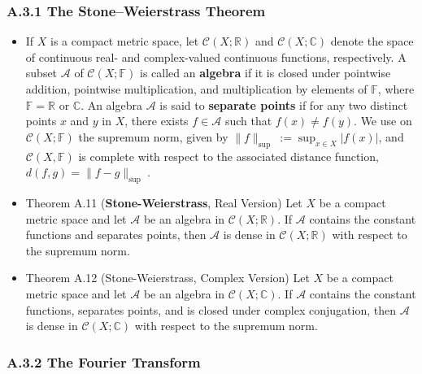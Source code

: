 \subsubsection{A.3.1 The Stone–Weierstrass Theorem}
\begin{itemize}
\item If $X$ is a compact metric space, let $\mathcal{C}(X ; \mathbb{R})$ and $\mathcal{C}(X ; \mathbb{C})$ denote the space of continuous real- and complex-valued continuous functions, respectively. A subset $\mathcal{A}$ of $\mathcal{C}(X ; \mathbb{F})$ is called an \textbf{algebra} if it is closed under pointwise addition, pointwise multiplication, and multiplication by elements of $\mathbb{F}$, where $\mathbb{F}=\mathbb{R}$ or $\mathbb{C}$. An algebra $\mathcal{A}$ is said to \textbf{separate points} if for any two distinct points $x$ and $y$ in $X$, there exists $f \in \mathcal{A}$ such that $f(x) \neq f(y)$. We use on $\mathcal{C}(X ; \mathbb{F})$ the supremum norm, given by $\|f\|_{\text {sup }}:=\sup _{x \in X}|f(x)|$, and $\mathcal{C}(X, \mathbb{F})$ is complete with respect to the associated distance function, $d(f, g)=\|f-g\|_{\text {sup }}$.

\item Theorem A.11 (\textbf{Stone-Weierstrass}, Real Version) Let $X$ be a compact metric space and let $\mathcal{A}$ be an algebra in $\mathcal{C}(X ; \mathbb{R})$. If $\mathcal{A}$ contains the constant functions and separates points, then $\mathcal{A}$ is dense in $\mathcal{C}(X ; \mathbb{R})$ with respect to the supremum norm.

\item Theorem A.12 (Stone-Weierstrass, Complex Version) Let $X$ be a compact metric space and let $\mathcal{A}$ be an algebra in $\mathcal{C}(X ; \mathbb{C})$. If $\mathcal{A}$ contains the constant functions, separates points, and is closed under complex conjugation, then $\mathcal{A}$ is dense in $\mathcal{C}(X ; \mathbb{C})$ with respect to the supremum norm.
\end{itemize}

\subsubsection{A.3.2 The Fourier Transform}

